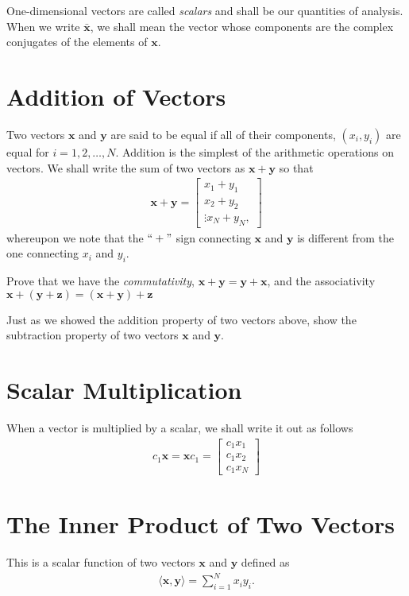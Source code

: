 One-dimensional vectors are called \textit{scalars} and shall be our quantities of analysis. When we write $\bar{\bm{x}}$, we shall mean the vector whose components are the complex conjugates of the elements of $\bm{x}$.

\section{Addition of Vectors}
%
Two vectors $\bm{x}$ and $\bm{y}$ are said to be equal if all of their components, $(x_i, y_i)$ are equal for $i=1,2,\ldots, N$. Addition is the simplest of the arithmetic operations on vectors. We shall write the sum of two vectors as $\bm{x} + \bm{y}$ so that 
%
\begin{align}
	\bm{x} + \bm{y} = \begin{bmatrix}
	x_1 + y_1 \\ x_2+y_2 \\ \vdots x_N + y_N,
	\end{bmatrix}
\end{align}
% 
whereupon we note that the $``+"$ sign connecting $\bm{x}$ and $\bm{y}$ is different from the one connecting $x_i$ and $y_i$.

\begin{homework}
	Prove that we have the \textit{commutativity}, $\bm{x}+\bm{y} = \bm{y} + \bm{x}$, and the associativity $\bm{x} + \left(\bm{y}+\bm{z}\right) = \left(\bm{x} + \bm{y}\right)+\bm{z}$
\end{homework}
%
\begin{homework}
	Just as we showed the addition property of two vectors above, show the subtraction property of two vectors $\bm{x}$ and $\bm{y}$.
\end{homework}

\section{Scalar Multiplication}
When a vector is multiplied by a scalar, we shall write it out as follows
%
\begin{align}
	c_1 \bm{x} = \bm{x} c_1 = \begin{bmatrix}
	c_1 x_1 \\ c_1 x_2 \\ c_1 x_N
	\end{bmatrix}
\end{align}
%
\section{The Inner Product of Two Vectors}
%
This is a scalar function of two vectors $\bm{x}$ and $\bm{y}$ defined as 
%
\begin{align}
	\langle \bm{x}, \bm{y} \rangle = \sum_{i=1}^{N} x_i y_i.
\end{align}

